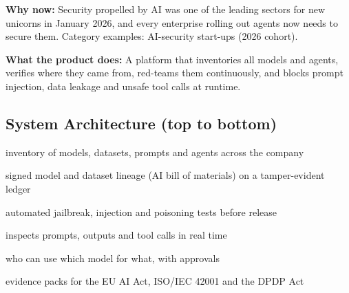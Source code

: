 \documentclass[10pt,a4paper]{article}
\begin{document}
\begin{tcolorbox}[colback=l1bg,colframe=l1bg,arc=2pt,borderline west={3pt}{0pt}{saffron},top=2pt,bottom=2pt]\small\textbf{Why now:} Security propelled by AI was one of the leading sectors for new unicorns in January 2026, and every enterprise rolling out agents now needs to secure them. {\color{muted}Category examples: AI-security start-ups (2026 cohort).}\end{tcolorbox}
\begin{tcolorbox}[colback=l3bg,colframe=l3bg,arc=2pt,borderline west={3pt}{0pt}{igreen},top=2pt,bottom=2pt]\small\textbf{What the product does:} A platform that inventories all models and agents, verifies where they came from, red-teams them continuously, and blocks prompt injection, data leakage and unsafe tool calls at runtime.\end{tcolorbox}
\subsection*{System Architecture (top to bottom)}
\begin{tcolorbox}[colback=lay0,colframe=lay0,arc=2pt,top=1.5pt,bottom=1.5pt,left=6pt,before skip=2pt,after skip=2pt]\small{} inventory of models, datasets, prompts and agents across the company\end{tcolorbox}
\begin{tcolorbox}[colback=lay1,colframe=lay1,arc=2pt,top=1.5pt,bottom=1.5pt,left=6pt,before skip=2pt,after skip=2pt]\small{} signed model and dataset lineage (AI bill of materials) on a tamper-evident ledger\end{tcolorbox}
\begin{tcolorbox}[colback=lay2,colframe=lay2,arc=2pt,top=1.5pt,bottom=1.5pt,left=6pt,before skip=2pt,after skip=2pt]\small{} automated jailbreak, injection and poisoning tests before release\end{tcolorbox}
\begin{tcolorbox}[colback=lay3,colframe=lay3,arc=2pt,top=1.5pt,bottom=1.5pt,left=6pt,before skip=2pt,after skip=2pt]\small{} inspects prompts, outputs and tool calls in real time\end{tcolorbox}
\begin{tcolorbox}[colback=lay4,colframe=lay4,arc=2pt,top=1.5pt,bottom=1.5pt,left=6pt,before skip=2pt,after skip=2pt]\small{} who can use which model for what, with approvals\end{tcolorbox}
\begin{tcolorbox}[colback=lay5,colframe=lay5,arc=2pt,top=1.5pt,bottom=1.5pt,left=6pt,before skip=2pt,after skip=2pt]\small{} evidence packs for the EU AI Act, ISO/IEC 42001 and the DPDP Act\end{tcolorbox}
\end{document}
